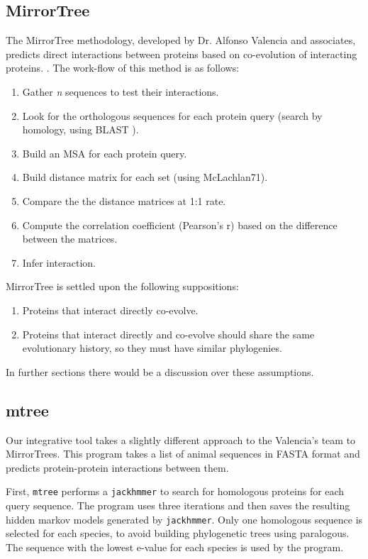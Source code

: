 \documentclass[11pt]{article}
\begin{document}
\subsection{MirrorTree}
The MirrorTree methodology, developed by Dr. Alfonso Valencia and associates, predicts direct interactions between proteins based on co-evolution of interacting proteins. \cite{Pazos2001}. The work-flow of this method is as follows:
\begin{enumerate}
\setlength{\itemsep}{1pt}
	\item Gather \textit{n} sequences to test their interactions.
	\item Look for the orthologous sequences for each protein query (search by homology, using BLAST \cite{BLAST}).
	\item Build an MSA for each protein query.
	\item Build distance matrix for each set (using McLachlan71).
	\item Compare the the distance matrices at 1:1 rate.
	\item Compute the correlation coefficient (Pearson's r) based on the difference between the matrices.
	\item Infer interaction.
\end{enumerate}
MirrorTree is settled upon the following suppositions:
\begin{enumerate}
\setlength{\itemsep}{1pt}
	\item Proteins that interact directly co-evolve.
	\item Proteins that interact directly and co-evolve should share the same evolutionary history, so they must have similar phylogenies.
\end{enumerate}
In further sections there would be a discussion over these assumptions.

\subsection{mtree}

Our integrative tool takes a slightly different approach to the Valencia's team to MirrorTrees. This program takes a list of animal sequences in FASTA format and predicts protein-protein interactions between them.

First, \texttt{mtree} performs a \texttt{jackhmmer} to search for homologous proteins for each query sequence. The program uses three iterations and then saves the resulting hidden markov models generated by \texttt{jackhmmer}. Only one homologous sequence is selected for each species, to avoid building phylogenetic trees using paralogous. The sequence with the lowest e-value for each species is used by the program.
\end{document}
